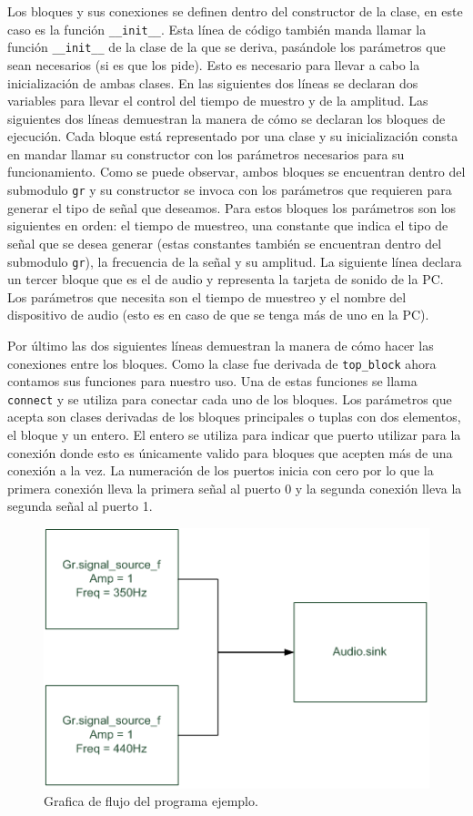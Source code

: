 Los bloques y sus conexiones se definen dentro del constructor de la clase, en
este caso es la funci\'on \verb|__init__|. Esta l\'inea de c\'odigo tambi\'en
manda llamar la funci\'on \verb|__init__| de la clase de la que se deriva,
pas\'andole los par\'ametros que sean necesarios (si es que los pide). Esto es
necesario para llevar a cabo la inicializaci\'on de ambas clases. En las
siguientes dos l\'ineas se declaran dos variables para llevar el control del
tiempo de muestro y de la amplitud. Las siguientes dos l\'ineas demuestran la
manera de c\'omo se declaran los bloques de ejecuci\'on. Cada bloque est\'a
representado por una clase y su inicializaci\'on consta en mandar llamar su
constructor con los par\'ametros necesarios para su funcionamiento. Como se
puede observar, ambos bloques se encuentran dentro del submodulo \verb|gr| y su
constructor se invoca con los par\'ametros que requieren para generar el tipo de
se\~nal que deseamos. Para estos bloques los par\'ametros son los siguientes en
orden: el tiempo de muestreo, una constante que indica el tipo de se\~nal que se
desea generar (estas constantes tambi\'en se encuentran dentro del submodulo
\verb|gr|), la frecuencia de la se\~nal y su amplitud. La siguiente l\'inea
declara un tercer bloque que es el de audio y representa la tarjeta de sonido de
la PC. Los par\'ametros que necesita son el tiempo de muestreo y el nombre del
dispositivo de audio (esto es en caso de que se tenga m\'as de uno en la PC).

Por \'ultimo las dos siguientes l\'ineas demuestran la manera de c\'omo hacer
las conexiones entre los bloques. Como la clase fue derivada de \verb|top_block|
ahora contamos sus funciones para nuestro uso. Una de estas funciones se llama
\verb|connect| y se utiliza para conectar cada uno de los bloques. Los
par\'ametros que acepta son clases derivadas de los bloques principales o tuplas
con dos elementos, el bloque y un entero. El entero se utiliza para indicar que
puerto utilizar para la conexi\'on donde esto es \'unicamente valido para
bloques que acepten m\'as de una conexi\'on a la vez.  La numeraci\'on de los
puertos inicia con cero por lo que la primera conexi\'on lleva la primera
se\~nal al puerto 0 y la segunda conexi\'on lleva la segunda se\~nal al puerto
1.

\begin{figure}[hptb]
\centering
	\includegraphics{figs/gnuradioexam}
	\caption{Grafica de flujo del programa ejemplo.}
	\label{fig:gnuradioexam}
\end{figure}

